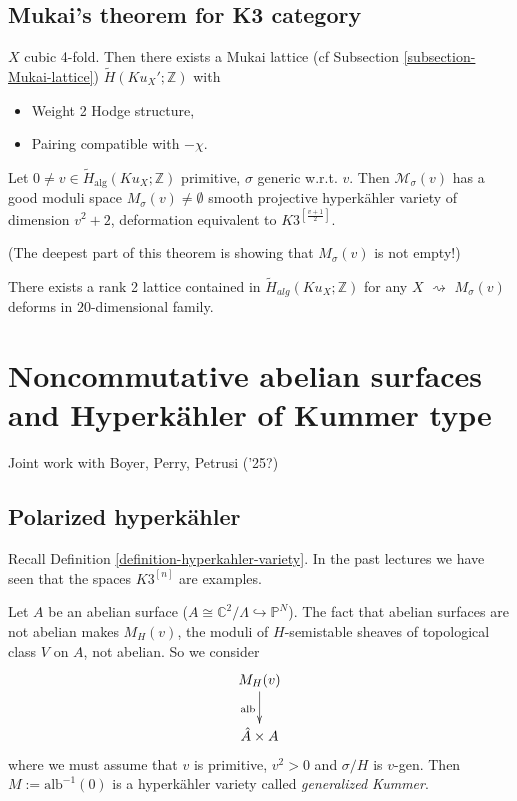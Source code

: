 \subsection{Mukai's theorem for K3 category}
\label{nasak-label-008}

\begin{proposition}
\label{proposition-4-fold-Mukai-lattice}
$X$ cubic 4-fold. Then there exists a Mukai
lattice (cf Subsection
\ref{subsection-Mukai-lattice})
$\tilde{H}(Ku_X';\mathbb{Z})$ with
\begin{itemize}
\item Weight 2 Hodge structure,
\item Pairing compatible with $-\chi$.
\end{itemize}
\end{proposition}

\begin{theorem}[BLMNPS]
\label{theorem-BLMNPS}
Let $0 \neq  v \in
\tilde{H}_{\text{alg}}(Ku_X;\mathbb{Z})$
primitive, $\sigma$ generic w.r.t. $v$. Then
$\mathcal{M}_{\sigma}(v)$ has a good moduli
space $M_{\sigma}(v)\neq \emptyset$ smooth
projective hyperk\"ahler variety of dimension
$v^2+2$, deformation equivalent to
$K3^{\left[ \frac{v+1}{2 } \right] }$.
\end{theorem}

(The deepest part of this theorem is showing
that $M_{\sigma}(v)$ is not empty!)

\medskip\noindent
There exists a rank 2 lattice contained in
$\tilde{H}_{alg}(Ku_X;\mathbb{Z})$ for any
$X$ $\rightsquigarrow $ $M_\sigma(v)$ deforms
in $20$-dimensional family.

\section{Noncommutative abelian surfaces and
Hyperk\"ahler of Kummer type}
\label{nasak-label-009}

Joint work with Boyer, Perry, Petrusi ('25?)

\subsection{Polarized hyperk\"ahler}
\label{subsection-polarized-hyperkahler}

Recall Definition
\ref{definition-hyperkahler-variety}. In the
past lectures we have seen that the spaces
$K3^{[n]}$ are examples.

Let $A$ be an abelian surface ($A \cong
\mathbb{C}^2/\Lambda
\hookrightarrow\mathbb{P}^N$). The fact that
abelian surfaces are not abelian makes
$M_H(v)$, the moduli of $H$-semistable
sheaves of topological class $V$ on $A$, not
abelian. So we consider
$$
\xymatrix{
M_H(v)\ar[d]_{\text{alb}}\\
\hat{A}\times A
}
$$
where we must assume that $v$ is primitive,
$v^2>0$ and $\sigma/H$ is $v$-gen. Then
$M:=\text{alb}^{-1}(0)$ is a hyperk\"ahler
variety called {\it generalized Kummer}.

